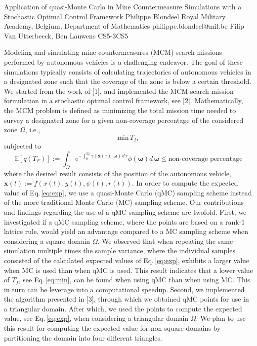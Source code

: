\begin{talk}
  {Application of quasi-Monte Carlo in Mine Countermeasure Simulations with a  Stochastic Optimal Control Framework}%
  {Philippe Blondeel}%
  {Royal Military Academy, Belgium, Department of Mathematics}%
  {philippe.blondeel@mil.be}%
  {Filip Van Utterbeeck, Ben Lauwens}%
{}{}{CS5-3}{CS5}


				
				

Modeling and simulating mine countermeasures (MCM) search missions performed by autonomous vehicles is a challenging endeavor. The goal of these simulations typically consists of calculating trajectories of autonomous vehicles in a designated zone such that the coverage of the zone is below a certain threshold. We started from the work of [1], and implemented the MCM search mission formulation in a stochastic optimal control framework, see [2]. Mathematically, the MCM problem is defined as minimizing the total mission time needed to survey a designated zone for a given non-coverage percentage of the considered zone $\Omega$, i.e.,
\begin{equation}
\text{min}\, T_f,
\label{eq:min}
\end{equation}
subjected to
\begin{equation}
 \mathbb{E}[q\left(T_F\right)] :=  \int_\Omega \text{e}^{-\int_0^{T_F} \gamma\left(\bm{x}\left(\tau\right),\bm{\omega}\right)\, d\,\tau}\phi\left(\bm{\omega}\right) d\,\bm{\omega} \leq \text{non-coverage percentage}
\label{eq:exp}
\end{equation}
where the  desired result consists of the position of the autonomous vehicle,  \\
$\bm{x}\left(t\right) := f(x(t), y(t), \psi(t), r(t))$. In order to compute the expected value of Eq.\,\eqref{eq:exp}, we use a quasi-Monte Carlo (qMC) sampling scheme instead of the more traditional Monte Carlo (MC) sampling scheme. Our contributions and findings regarding the use of a qMC sampling scheme are twofold. First, we investigated if a qMC sampling scheme, where the points are based on a rank-1 lattice rule, would yield an advantage compared to a MC sampling scheme when considering a square domain $\Omega$. We observed that when repeating the same simulation multiple times the sample variance,  where the individual samples consisted of the calculated expected values of Eq.\,\eqref{eq:exp}, exhibits a larger value when  MC is used than when  qMC is used. This result indicates that a lower value of $T_f$, see Eq.\,\eqref{eq:min}, can be found when using qMC than when using MC. This in turn can be leverage into a computational speedup. Second, we implemented the algorithm presented in [3], through which we obtained qMC points for use in a triangular domain. After which, we used the points to compute the expected value, see Eq.\,\eqref{eq:exp}, when considering a triangular domain $\Omega$. We plan to use this result for computing the expected value for non-square domains by  partitioning the domain into four different triangles. 

\end{talk}
